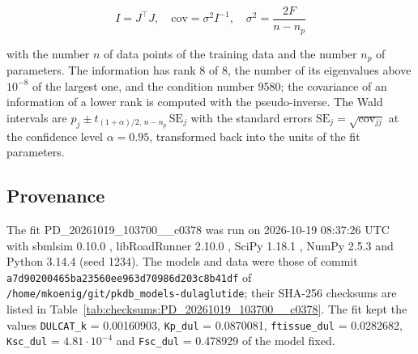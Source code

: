 \documentclass{article}
\begin{document}
\begin{equation}
I = J^\top J, \quad \mathrm{cov} = \sigma^2 I^{-1}, \quad \sigma^2 = \frac{2 F}{n - n_p}
\end{equation}

with the number $n$ of data points of the training data and the number $n_p$ of parameters. The information has rank 8 of 8, the number of its eigenvalues above $10^{-8}$ of the largest one, and the condition number 9580; the covariance of an information of a lower rank is computed with the pseudo-inverse. The Wald intervals are $\hat{p}_j \pm t_{(1+\alpha)/2,\, n-n_p}\, \mathrm{SE}_j$ with the standard errors $\mathrm{SE}_j = \sqrt{\mathrm{cov}_{jj}}$ at the confidence level $\alpha = 0.95$, transformed back into the units of the fit parameters.

\subsection{Provenance}

The fit PD\_20261019\_103700\_\_c0378 was run on 2026-10-19 08:37:26 UTC with sbmlsim 0.10.0 \cite{Koenig2026_sbmlsim}, libRoadRunner 2.10.0 \cite{Welsh2023}, SciPy 1.18.1 \cite{Virtanen2020}, NumPy 2.5.3 \cite{Harris2020} and Python 3.14.4 (seed 1234). The models and data were those of commit \texttt{a7d90200465ba23560ee963d70986d203c8b41df} of \texttt{/home/mkoenig/git/pkdb\_models-dulaglutide}; their SHA-256 checksums are listed in Table~\ref{tab:checksums:PD_20261019_103700__c0378}. The fit kept the values \texttt{DULCAT\_k} = 0.00160903, \texttt{Kp\_dul} = 0.0870081, \texttt{ftissue\_dul} = 0.0282682, \texttt{Ksc\_dul} = $4.81 \cdot 10^{-4}$ and \texttt{Fsc\_dul} = 0.478929 of the model fixed.
\end{document}
